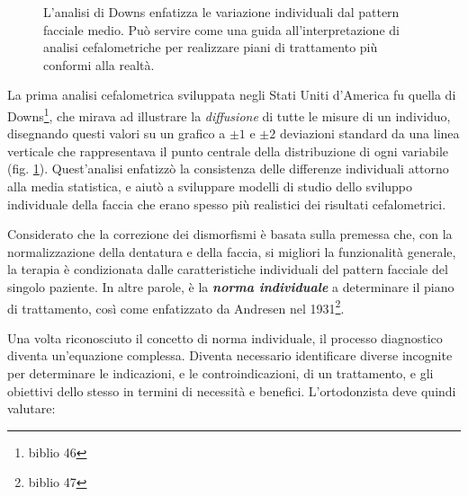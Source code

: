 \begin{figure}
\centering
{}
\caption{L'analisi di Downs enfatizza le variazione individuali dal pattern facciale medio. Può servire come una guida all'interpretazione di analisi cefalometriche per realizzare piani di trattamento più conformi alla realtà.}
\label{fig:downs}
\end{figure}

La prima analisi cefalometrica sviluppata negli Stati Uniti d'America fu quella di Downs\footnote{biblio 46}, che mirava ad illustrare la \textit{diffusione} di tutte le misure di un individuo, disegnando questi valori su un grafico a $\pm1$ e $\pm2$ deviazioni standard da una linea verticale che rappresentava il punto centrale della distribuzione di ogni variabile (fig. \ref{fig:downs}). Quest'analisi enfatizzò la consistenza delle differenze individuali attorno alla media statistica, e aiutò a sviluppare modelli di studio dello sviluppo individuale della faccia che erano spesso più realistici dei risultati cefalometrici.

Considerato che la correzione dei dismorfismi è basata sulla premessa che, con la normalizzazione della dentatura e della faccia, si migliori la funzionalità generale, la terapia è condizionata dalle caratteristiche individuali del pattern facciale del singolo paziente. In altre parole, è la \textbf{\textit{norma individuale}} a determinare il piano di trattamento, così come enfatizzato da Andresen nel 1931\footnote{biblio 47}.

Una volta riconosciuto il concetto di norma individuale, il processo diagnostico diventa un'equazione complessa. Diventa necessario identificare diverse incognite per determinare le indicazioni, e le controindicazioni, di un trattamento, e gli obiettivi dello stesso in termini di necessità e benefici. L'ortodonzista deve quindi valutare:

